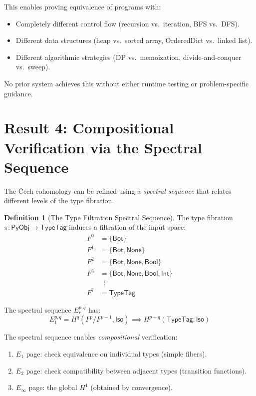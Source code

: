 \documentclass[11pt,a4paper]{report}
\theoremstyle{definition}
\newtheorem{definition}{Definition}[chapter]
\theoremstyle{plain}
\newcommand{\PyObj}{\mathsf{PyObj}}
\newcommand{\Iso}{\mathsf{Iso}}
\newcommand{\Hone}{H^1}
\begin{document}
This enables proving equivalence of programs with:
\begin{itemize}
  \item Completely different control flow (recursion vs.\ iteration,
    BFS vs.\ DFS).
  \item Different data structures (heap vs.\ sorted array,
    OrderedDict vs.\ linked list).
  \item Different algorithmic strategies (DP vs.\ memoization,
    divide-and-conquer vs.\ sweep).
\end{itemize}

No prior system achieves this without either runtime testing or
problem-specific guidance.

\section{Result 4: Compositional Verification via the Spectral Sequence}

The \v{C}ech cohomology can be refined using a \emph{spectral sequence}
that relates different levels of the type fibration.

\begin{definition}[The Type Filtration Spectral Sequence]
The type fibration $\pi : \PyObj \to \mathsf{TypeTag}$ induces a
filtration of the input space:
\begin{align}
  F^0 &= \{\mathsf{Bot}\} \\
  F^1 &= \{\mathsf{Bot}, \mathsf{None}\} \\
  F^2 &= \{\mathsf{Bot}, \mathsf{None}, \mathsf{Bool}\} \\
  F^3 &= \{\mathsf{Bot}, \mathsf{None}, \mathsf{Bool}, \mathsf{Int}\} \\
  &\;\;\vdots \\
  F^7 &= \mathsf{TypeTag}
\end{align}

The spectral sequence $E_r^{p,q}$ has:
\[
  E_1^{p,q} = H^q(F^p / F^{p-1}, \Iso) \implies
  H^{p+q}(\mathsf{TypeTag}, \Iso)
\]
\end{definition}

The spectral sequence enables \emph{compositional} verification:
\begin{enumerate}
  \item $E_1$ page: check equivalence on individual types (simple
    fibers).
  \item $E_2$ page: check compatibility between adjacent types
    (transition functions).
  \item $E_\infty$ page: the global $\Hone$ (obtained by convergence).
\end{enumerate}
\end{document}
